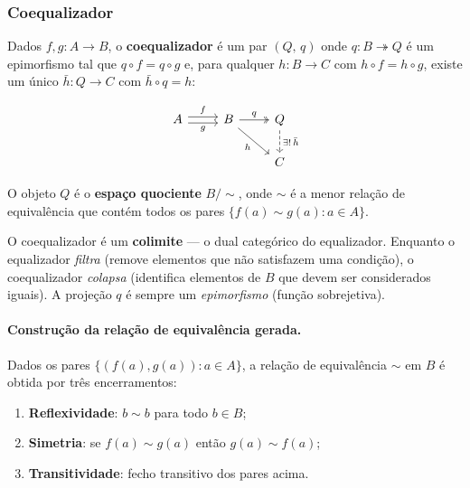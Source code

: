 \subsubsection{Coequalizador}

\begin{definition}
	Dados $f, g : A \to B$, o \textbf{coequalizador} é um par
	$(Q,\, q)$ onde $q : B \twoheadrightarrow Q$ é um epimorfismo
	tal que $q \circ f = q \circ g$ e, para qualquer
	$h : B \to C$ com $h \circ f = h \circ g$, existe um único
	$\bar{h} : Q \to C$ com $\bar{h} \circ q = h$:
	
	\[
	\begin{tikzcd}
		A \arrow[r, shift left, "f"] \arrow[r, shift right, "g", swap] &
		B \arrow[r, two heads, "q"] \arrow[dr, "h", swap] &
		Q \arrow[d, dashed, "\exists!\,\bar{h}"] \\
		& & C
	\end{tikzcd}
	\]
	
	O objeto $Q$ é o \textbf{espaço quociente} $B/{\sim}$, onde
	$\sim$ é a menor relação de equivalência que contém todos os
	pares $\{f(a) \sim g(a) : a \in A\}$.
\end{definition}

\begin{remark}
	O coequalizador é um \textbf{colimite} — o dual categórico do
	equalizador. Enquanto o equalizador \emph{filtra} (remove elementos
	que não satisfazem uma condição), o coequalizador \emph{colapsa}
	(identifica elementos de $B$ que devem ser considerados iguais).
	A projeção $q$ é sempre um \emph{epimorfismo} (função sobrejetiva).
\end{remark}

\paragraph{Construção da relação de equivalência gerada.}
Dados os pares $\{(f(a), g(a)) : a \in A\}$, a relação de
equivalência $\sim$ em $B$ é obtida por três encerramentos:
\begin{enumerate}
	\item \textbf{Reflexividade}: $b \sim b$ para todo $b \in B$;
	\item \textbf{Simetria}: se $f(a) \sim g(a)$ então $g(a) \sim f(a)$;
	\item \textbf{Transitividade}: fecho transitivo dos pares acima.
\end{enumerate}

